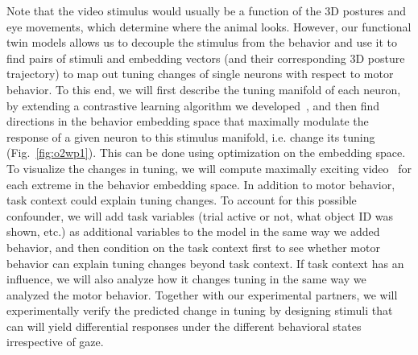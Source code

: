 \documentclass[B2,COG]{ercgrant}
\begin{document}
Note that the video stimulus would usually be a function of the 3D postures and eye movements, which determine where the animal looks. 
However, our functional twin models allows us to decouple the stimulus from the behavior and use it to find pairs of stimuli and embedding vectors (and their corresponding 3D posture trajectory) to map out tuning changes of single neurons with respect to motor behavior. 
To this end, we will first describe the tuning manifold of each neuron, by extending a contrastive learning algorithm we developed~\parencite{Baroni2022-fi}, and then find directions in the behavior embedding space that maximally modulate the response of a given neuron to this stimulus manifold, i.e. change its tuning (Fig.~\ref{fig:o2wp1}).
This can be done using optimization on the embedding space. 
To visualize the changes in tuning, we will compute maximally exciting video~\parencite{Walker2019-yw} for each extreme in the behavior embedding space. 
In addition to motor behavior, task context could explain tuning changes. 
To account for this possible confounder, we will add task variables (trial active or not, what object ID was shown, etc.) as additional variables to the model in the same way we added behavior, and then condition on the task context first to see whether motor behavior can explain tuning changes beyond task context. 
If task context has an influence, we will also analyze how it changes tuning in the same way we analyzed the motor behavior. 
Together with our experimental partners, we will experimentally verify the predicted change in tuning by designing stimuli that can will yield differential responses under the different behavioral states irrespective of gaze. 
\end{document}
